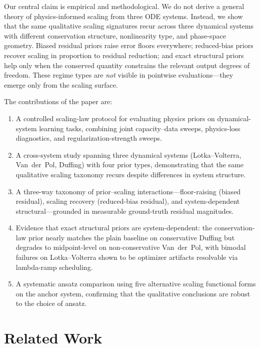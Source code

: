 \documentclass[11pt]{article}
\begin{document}
Our central claim is empirical and methodological.
We do not derive a general theory of physics-informed scaling from three ODE systems.
Instead, we show that the same qualitative scaling signatures recur across three dynamical systems with different conservation structure, nonlinearity type, and phase-space geometry.
Biased residual priors raise error floors everywhere; reduced-bias priors recover scaling in proportion to residual reduction; and exact structural priors help only when the conserved quantity constrains the relevant output degrees of freedom.
These regime types are \emph{not} visible in pointwise evaluations---they emerge only from the scaling surface.

The contributions of the paper are:

\begin{enumerate}[leftmargin=*, itemsep=0.3em]
    \item A controlled scaling-law protocol for evaluating physics priors on dynamical-system learning tasks, combining joint capacity--data sweeps, physics-loss diagnostics, and regularization-strength sweeps.
    \item A cross-system study spanning three dynamical systems (Lotka--Volterra, Van~der~Pol, Duffing) with four prior types, demonstrating that the same qualitative scaling taxonomy recurs despite differences in system structure.
    \item A three-way taxonomy of prior--scaling interactions---floor-raising (biased residual), scaling recovery (reduced-bias residual), and system-dependent structural---grounded in measurable ground-truth residual magnitudes.
    \item Evidence that exact structural priors are system-dependent: the conservation-law prior nearly matches the plain baseline on conservative Duffing but degrades to midpoint-level on non-conservative Van~der~Pol, with bimodal failures on Lotka--Volterra shown to be optimizer artifacts resolvable via lambda-ramp scheduling.
    \item A systematic ansatz comparison using five alternative scaling functional forms on the anchor system, confirming that the qualitative conclusions are robust to the choice of ansatz.
\end{enumerate}

\section{Related Work}
\end{document}
